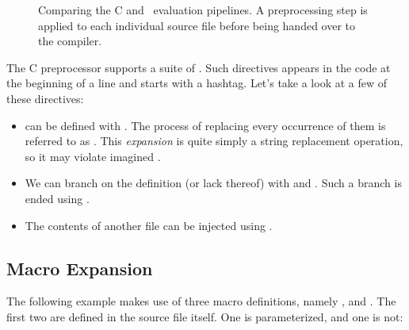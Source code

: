 \begin{figure}[tbp]
  
  \caption[Comparing the C and \csharp\ evaluation pipelines.]{Comparing the C and \csharp\ evaluation pipelines. A preprocessing step is applied to each individual source file before being handed over to the compiler.}
  \label{fig:generics:c}
\end{figure}

The C preprocessor supports a suite of . Such directives appears in the code at the beginning of a line and starts with a hashtag. Let's take a look at a few of these directives:
\begin{itemize}
  \item {} can be defined with . The process of replacing every occurrence of them is referred to as . This \textsl{expansion} is quite simply a string replacement operation, so it may violate imagined .
  \item We can branch on the definition (or lack thereof) with  and . Such a branch is ended using .
  \item The contents of another file can be injected using .
\end{itemize}

\subsection{Macro Expansion}

The following example makes use of three macro definitions, namely ,  and . The first two are defined in the source file itself. One is parameterized, and one is not:

